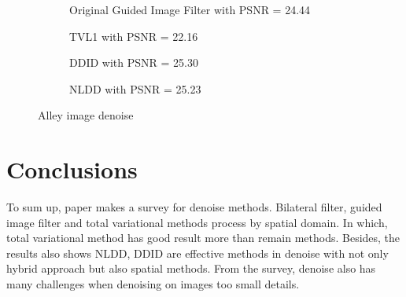 \begin{figure*}[ht]
	\centering
	\begin{subfigure}{0.5\textwidth}
		\caption{Original Guided Image Filter with PSNR = 24.44}
		\label{fig:NoisyFlowers}
	\end{subfigure}%
	\begin{subfigure}{0.5\textwidth}
		\caption{TVL1 with PSNR = 22.16}
		\label{fig:Alley_80_TVL1}
	\end{subfigure}
	\begin{subfigure}{0.5\textwidth}
		\caption{DDID with PSNR = 25.30}
		\label{fig:Alley_80_DDID}
	\end{subfigure}%
	\begin{subfigure}{0.5\textwidth}
		\caption{NLDD with PSNR = 25.23}
		\label{fig:Alley_80_DDID_nlb}
	\end{subfigure}
	\caption{Alley image denoise}
	\label{fig:Denoise Alley image}
\end{figure*}


\section{Conclusions}
To sum up, paper makes a survey for denoise methods. Bilateral filter, guided image filter and total variational methods process by spatial domain. In which, total variational method has good result more than remain methods. Besides, the results also shows NLDD, DDID are effective methods in denoise with not only hybrid approach but also spatial methods. From the survey, denoise also has many challenges when denoising on images too small details. 